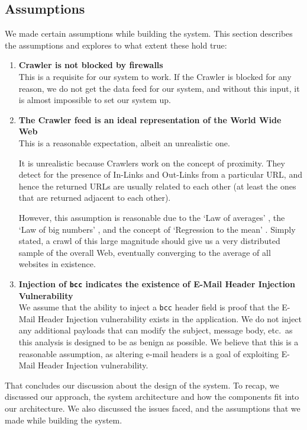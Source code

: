 \subsection{Assumptions}
We made certain assumptions while building the system. This section describes the assumptions and explores to what extent these hold true:
\begin{enumerate}
	\item \textbf{Crawler is not blocked by firewalls}\\
	This is a requisite for our system to work. If the Crawler is blocked for any reason, we do not get the data feed for our system, and without this input, it is almost impossible to set our system up.
	\item \textbf{The Crawler feed is an ideal representation of the World Wide Web} \\
	This is a reasonable expectation, albeit an unrealistic one.
	
	It is unrealistic because Crawlers work on the concept of proximity. They detect for the presence of In-Links and Out-Links from a particular URL, and hence the returned URLs are usually related to each other (at least the ones that are returned adjacent to each other).
	
	However, this assumption is reasonable due to the `Law of averages' \cite{wiki:Law_of_averages}, the `Law of big numbers' \cite{wiki:Law_of_large_numbers}, and the concept of `Regression to the mean' \cite{wiki:Regression_toward_the_mean}. Simply stated, a crawl of this large magnitude should give us a very distributed sample of the overall Web, eventually converging to the average of all websites in existence.
	
	\item \textbf{Injection of \texttt{bcc} indicates the existence of E-Mail Header Injection Vulnerability} \\
	We assume that the ability to inject a \texttt{bcc} header field is proof that the E-Mail Header Injection vulnerability exists in the application. We do not inject any additional payloads that can modify the subject, message body, etc.\ as this analysis is designed to be as benign as possible.
	We believe that this is a reasonable assumption, as altering e-mail headers is a goal of exploiting E-Mail Header Injection vulnerability.
\end{enumerate}

That concludes our discussion about the design of the system. To recap, we discussed our approach, the system architecture and how the components fit into our architecture. We also discussed the issues faced, and the assumptions that we made while building the system. %